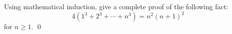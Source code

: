 Using mathematical induction, give a complete proof of the following fact:
\[
  4(1^3 + 2^3 + \cdots + n^3) = n^2(n+1)^2
\]
for $n \geq 1$.
\qed
